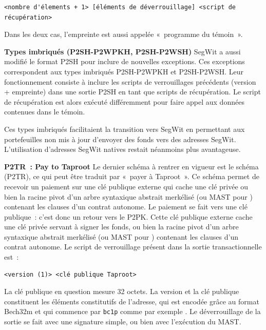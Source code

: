\begin{Verbatim}[fontsize=\small]
<nombre d'élements + 1> [éléments de déverrouillage] <script de récupération>
\end{Verbatim}

Dans les deux cas, l'empreinte est aussi appelée «~programme du témoin~».

\textbf{Types imbriqués (P2SH-P2WPKH, P2SH-P2WSH)} SegWit a aussi modifié le format P2SH pour inclure de nouvelles exceptions. Ces exceptions correspondent aux types imbriqués P2SH-P2WPKH et P2SH-P2WSH. Leur fonctionnement consiste à inclure les scripts de verrouillages précédents (version + empreinte) dans une sortie P2SH en tant que scripts de récupération. Le script de récupération est alors exécuté différemment pour faire appel aux données contenues dans le témoin.

Ces types imbriqués facilitaient la transition vers SegWit en permettant aux portefeuilles non mis à jour d'envoyer des fonds vers des adresses SegWit. L'utilisation d'adresses SegWit natives restait néanmoins plus avantageuse.

\textbf{P2TR~: Pay to Taproot} Le dernier schéma à rentrer en vigueur est le schéma  (P2TR), ce qui peut être traduit par «~payer à Taproot~». Ce schéma permet de recevoir un paiement sur une clé publique externe qui cache une clé privée ou bien la racine pivot d'un arbre syntaxique abstrait merkélisé (ou MAST pour ) contenant les clauses d'un contrat autonome. Le paiement se fait vers une clé publique~: c'est donc un retour vers le P2PK. Cette clé publique externe cache une clé privée servant à signer les fonds, ou bien la racine pivot d'un arbre syntaxique abstrait merkélisé (ou MAST pour ) contenant les clauses d'un contrat autonome. Le script de verrouillage présent dans la sortie transactionnelle est~:

\begin{Verbatim}[fontsize=\small]
<version (1)> <clé publique Taproot>
\end{Verbatim}

La clé publique en question mesure 32 octets. La version et la clé publique constituent les éléments constitutifs de l'adresse, qui est encodée grâce au format Bech32m et qui commence par \texttt{bc1p} comme par exemple . Le déverrouillage de la sortie se fait avec une signature simple, ou bien avec l'exécution du MAST.

